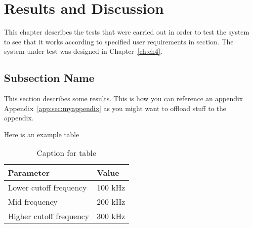 \chapter{\label{ch:results} Results and Discussion}

This chapter describes the tests that were carried out in order to test the system to see that it works according to specified user requirements in section. The system under test was designed in Chapter~\ref{ch:ch4}.

\section{\label{sec:ch5_subsec1}Subsection Name}

This section describes some results. This is how you can reference an appendix Appendix~\ref{app:sec:myappendix} as you might want to offload stuff to the appendix.

Here is an example table

\begin{table}[!ht]
	\centering
	\caption{Caption for table}
	\begin{tabular}{l|l}
		\hline
		\textbf{Parameter}      & \textbf{Value}   \\ \hline
		Lower cutoff frequency  & 100 kHz  \\
		Mid frequency           & 200 kHz \\
		Higher cutoff frequency & 300 kHz \\ \hline
	\end{tabular}
	\label{tb:mytablename}
\end{table}
